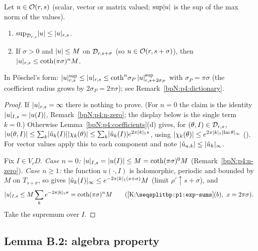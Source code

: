 \begin{lemma}[B.1]\label{bpN:p4:sup-weighted}
Let $u\in\mathcal O(r,s)$ (scalar, vector or matrix valued; $\sup\lvert u\rvert$ is the sup of the max norm of the values).
\begin{enumerate}[label=(\alph*)]
\item $\sup_{\mathcal D_{r,s}}\lvert u\rvert\le\lvert u\rvert_{r,s}$.
\item If $\sigma>0$ and $\lvert u\rvert\le M$ on $\mathcal D_{r,s+\sigma}$ (so $u\in\mathcal O(r,s+\sigma)$), then $\lvert u\rvert_{r,s}\le\coth(\pi\sigma)^n M$.
\end{enumerate}
In P\"oschel's form: $\lvert u\rvert^{\sup}_{r,s}\le\lvert u\rvert_{r,s}\le\coth^n\!\sigma_P\,\lvert u\rvert^{\sup}_{r,s+2\sigma_P}$ with $\sigma_P=\pi\sigma$ (the coefficient radius grows by $2\sigma_P=2\pi\sigma$); see Remark~\ref{bpN:p4:dictionary}.
\end{lemma}
\begin{proof}
\label{stepN:p4:b1-a} If $\lvert u\rvert_{r,s}=\infty$ there is nothing to prove. (For $n=0$ the claim is the identity $\lvert u\rvert_{I,s}=\lvert u(I)\rvert$, Remark~\ref{bpN:p4:n-zero}; the display below is the single term $k=0$.) Otherwise Lemma~\ref{bpN:p4:coefficients}(d) gives, for $(\theta,I)\in\mathcal D_{r,s}$, $\lvert u(\theta,I)\rvert\le\sum_k\lvert \hat u_k(I)\rvert\lvert \chi_k(\theta)\rvert\le\sum_k\lvert \hat u_k(I)\rvert e^{2\pi\lvert k\rvert_1s}$,
using $\lvert \chi_k(\theta)\rvert\le e^{2\pi\lvert k\rvert_1\lvert \operatorname{Im}\theta\rvert_\infty}$ (). For vector values apply this to each component and note $\lvert \hat u_{a,k}\rvert\le\lvert \hat u_k\rvert_\infty$.

\label{stepN:p4:b1-b} Fix $I\in V_rD$. \emph{Case $n=0$:} $\lvert u\rvert_{I,s}=\lvert u(I)\rvert\le M=\coth(\pi\sigma)^0M$ (Remark~\ref{bpN:p4:n-zero}). \emph{Case $n\ge1$:} the function $u(\cdot,I)$ is holomorphic, periodic and bounded by $M$ on $T_{s+\sigma}$, so  gives $\lvert \hat u_k(I)\rvert_\infty\le e^{-2\pi\lvert k\rvert_1(s+\sigma)}M$ (limit $\rho'\uparrow s+\sigma$), and
\[\wn uIs\le M\sum_ke^{-2\pi\abs k_1\sigma}=\coth(\pi\sigma)^nM\qquad(\Kref{bp:p1:exp-sums}(b),\ x=2\pi\sigma).\]
Take the supremum over $I$.
\end{proof}

\subsection{Lemma B.2: algebra property}\label{bpN:p4:s-b2}

